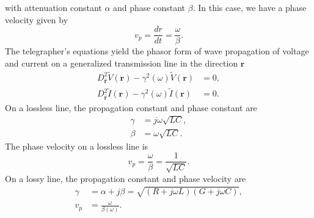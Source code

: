 \documentclass{article}
\begin{document}
with attenuation constant $\alpha$ and phase constant $\beta$. In this case, we have a phase velocity given by
\begin{equation}
	v_p=\frac{dr}{dt}=\frac{\omega}{\beta}.
\end{equation}
The telegrapher's equations yield the phasor form of wave propagation of voltage and current on a generalized transmission line in the direction $\mathbf{r}$
\begin{align}
	D^2_{\hat{\mathbf{r}}}\tilde{V}(\mathbf{r})-\gamma^2(\omega)\tilde{V}(\mathbf{r})&=0,\\
	D^2_{\hat{\mathbf{r}}}\tilde{I}(\mathbf{r})-\gamma^2(\omega)\tilde{I}(\mathbf{r})&=0.
\end{align}
On a lossless line, the propagation constant and phase constant are
\begin{align}
	\gamma&=j\omega\sqrt{LC},\\
	\beta&=\omega\sqrt{LC}.
\end{align}
The phase velocity on a lossless line is
\begin{equation}
	v_p=\frac{\omega}{\beta}=\frac{1}{\sqrt{LC}}.
\end{equation}
On a lossy line, the propagation constant and phase velocity are
\begin{align}
	\gamma&=\alpha+j\beta=\sqrt{(R+j\omega{L})(G+j\omega{C})},\\
	v_p&=\frac{\omega}{\beta(\omega)}.
\end{align}
\end{document}
